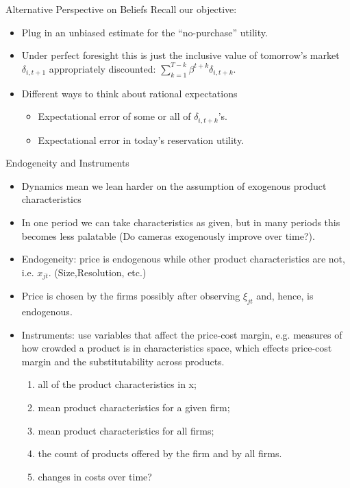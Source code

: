 \documentclass[aspectratio=169,11pt]{beamer}
\begin{document}
\begin{frame}{Alternative Perspective on Beliefs}
Recall our objective:
\begin{itemize}
\item Plug in an unbiased estimate for the ``no-purchase'' utility.
\item Under perfect foresight this is just the inclusive value of tomorrow's market $\delta_{i,t+1}$  appropriately discounted: $\sum_{k=1}^{T-k} \beta^{t+k} \delta_{i,t+k}$.
\item Different ways to think about \alert{rational expectations}
\begin{itemize}
\item Expectational error of some or all of $\delta_{i,t+k}$'s.
\item Expectational error in today's reservation utility.
\end{itemize}
\end{itemize}
\end{frame}


\begin{frame}{Endogeneity and Instruments}
\footnotesize
\begin{itemize}
\item Dynamics mean we  \alert{lean harder on the assumption of exogenous product characteristics} 
\item In one period we can take characteristics as given, but in many periods this becomes less palatable (Do cameras exogenously improve over time?).
\item Endogeneity: price is endogenous while other product characteristics are not, i.e. $x_{jt}$. (Size,Resolution, etc.)
\item Price is chosen by the firms possibly after observing $\xi_{jt}$ and, hence, is endogenous.
\item Instruments: use variables that affect the price-cost margin, e.g. measures of how crowded a product is in characteristics space, which effects price-cost margin and the substitutability across products.
\begin{enumerate}
\item  all of the product characteristics in x;
\item mean product characteristics for a given firm;
\item mean product characteristics for all firms;
\item the count of products offered by the firm and by all firms.
\item changes in costs over time?
\end{enumerate}
\end{itemize}
\end{frame}
\end{document}
